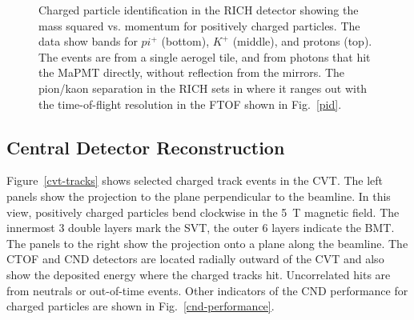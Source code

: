 \documentclass[final,3p,twocolumn]{elsarticle}
\begin{document}
\begin{figure}[t!]
\caption{Charged particle identification in the RICH detector showing the mass squared vs. momentum for positively
  charged particles. The data show bands for $pi^+$ (bottom), $K^+$ (middle), and protons (top). The events are
  from a single aerogel tile, and from photons that hit the MaPMT directly, without reflection from the mirrors. The
  pion/kaon separation in the RICH sets in where it ranges out with the time-of-flight resolution in the FTOF shown
  in Fig.~\ref{pid}.}
\label{rich_rec}
\end{figure}

\subsection{Central Detector Reconstruction}

Figure~\ref{cvt-tracks} shows selected charged track events in the CVT. The left panels show the projection to
the plane perpendicular to the beamline. In this view, positively charged particles bend clockwise in the 5~T
magnetic field. The innermost 3 double layers mark the SVT, the outer 6 layers indicate the BMT. The panels to
the right show the projection onto a plane along the beamline. The CTOF and CND detectors are located radially
outward of the CVT and also show the deposited energy where the charged tracks hit. Uncorrelated hits are from
neutrals or out-of-time events. Other indicators of the CND performance for charged particles are shown in
Fig.~\ref{cnd-performance}.  
\end{document}
